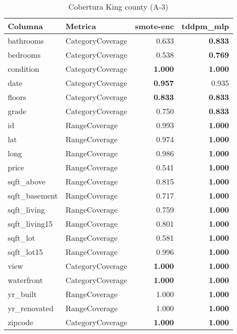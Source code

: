 \begin{table}[H]
\centering
\caption{Cobertura King county (A-3)}
\label{table-coverage-king county-a-3}
\begin{tabular}{|l|l|r|r|}
\hline
\rowcolor[gray]{0.8}
Columna & Metrica & smote-enc & tddpm\_mlp \\
\hline bathrooms & CategoryCoverage & 0.633 & \bfseries 0.833 \\
\hline bedrooms & CategoryCoverage & 0.538 & \bfseries 0.769 \\
\hline condition & CategoryCoverage & \bfseries 1.000 & \bfseries 1.000 \\
\hline date & CategoryCoverage & \bfseries 0.957 & 0.935 \\
\hline floors & CategoryCoverage & \bfseries 0.833 & \bfseries 0.833 \\
\hline grade & CategoryCoverage & 0.750 & \bfseries 0.833 \\
\hline id & RangeCoverage & 0.993 & \bfseries 1.000 \\
\hline lat & RangeCoverage & 0.974 & \bfseries 1.000 \\
\hline long & RangeCoverage & 0.986 & \bfseries 1.000 \\
\hline price & RangeCoverage & 0.541 & \bfseries 1.000 \\
\hline sqft\_above & RangeCoverage & 0.815 & \bfseries 1.000 \\
\hline sqft\_basement & RangeCoverage & 0.717 & \bfseries 1.000 \\
\hline sqft\_living & RangeCoverage & 0.759 & \bfseries 1.000 \\
\hline sqft\_living15 & RangeCoverage & 0.801 & \bfseries 1.000 \\
\hline sqft\_lot & RangeCoverage & 0.581 & \bfseries 1.000 \\
\hline sqft\_lot15 & RangeCoverage & 0.996 & \bfseries 1.000 \\
\hline view & CategoryCoverage & \bfseries 1.000 & \bfseries 1.000 \\
\hline waterfront & CategoryCoverage & \bfseries 1.000 & \bfseries 1.000 \\
\hline yr\_built & RangeCoverage & 1.000 & \bfseries 1.000 \\
\hline yr\_renovated & RangeCoverage & 1.000 & \bfseries 1.000 \\
\hline zipcode & CategoryCoverage & \bfseries 1.000 & \bfseries 1.000 \\
\hline
\end{tabular}
\end{table}
